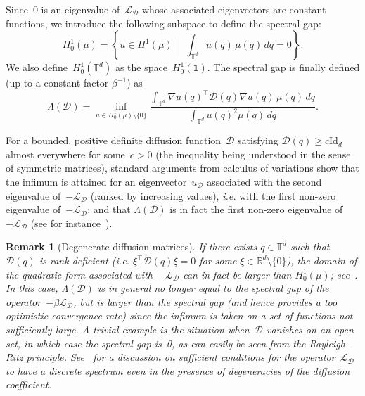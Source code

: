 \documentclass{article}
\newtheorem{remark}{Remark}
\newcommand{\dps}{\displaystyle }
\newcommand{\cL}{\mathcal{L}}
\newcommand{\R}{\mathbb{R}}
\newcommand{\Id}{\mathrm{Id}}
\renewcommand{\geq}{\geqslant}
\def\R{\mathbb{R}}
\def\T{\mathbb{T}}
\newcommand{\Diff}{\mathcal{D}}
\renewcommand{\dim}{d}
\newcommand{\cLD}{\cL_\Diff}
\begin{document}
Since~0 is an eigenvalue of~$\cLD$ whose associated eigenvectors are constant functions, we introduce the following subspace to define the spectral gap:
\[
H^1_0(\mu) = \left\{ u \in H^1(\mu) \ \middle| \ \int_{\T^\dim} u(q) \, \mu(q) \, dq = 0\right\}.
\]
We also define~$H^1_0(\T^\dim)$ as the space~$H^1_0(\mathbf{1})$. 
The spectral gap is finally defined (up to a constant factor $\beta^{-1}$) as
\begin{equation}
  \label{eq:lambdaD-init}
  \Lambda(\Diff) = \inf_{u \in H^1_0(\mu) \setminus\{0\}} \frac{\dps \int_{\T^\dim} \nabla u (q)^{\top}\Diff(q) \nabla u (q) \, \mu(q)\,dq}{\dps \int_{\T^\dim} u(q)^2 \mu(q)\,dq}.
\end{equation}

For a bounded, positive definite diffusion function~$\Diff$ satisfying $\Diff(q) \geq c \Id_\dim$ almost everywhere for some~$c>0$ (the inequality being understood in the sense of symmetric matrices), standard arguments from calculus of variations
show that the infimum is attained for an eigenvector~$u_\Diff$ associated with the second eigenvalue of~$-\cLD$ (ranked by increasing values), \emph{i.e.} with the first non-zero eigenvalue of~$-\cLD$; and that $\Lambda(\Diff)$ is in fact the first non-zero eigenvalue of $-\cLD$ (see for instance~\cite[Chapter~1]{Henrot}).

\begin{remark}[Degenerate diffusion matrices]
  \label{rmk:SG_when_\dim_cancels}
  If there exists $q\in\T^\dim$ such that $\Diff(q)$ is rank deficient (\emph{i.e.} $\xi^{\top}\Diff(q)\xi=0$ for some $\xi\in\R^\dim \setminus \{0\}$), the domain of the quadratic form associated with~$-\cLD$ can in fact be larger than $H^1_0(\mu)$; see~\cite{Zhikov_1998}. In this case, $\Lambda(\Diff)$ is in general no longer equal to the spectral gap of the operator~$-\beta \cLD$, but is larger than the spectral gap (and hence provides a too optimistic convergence rate) since the infimum is taken on a set of functions not sufficiently large. A trivial example is the situation when~$\Diff$ vanishes on an open set, in which case the spectral gap is~0, as can easily be seen from the Rayleigh--Ritz principle. See~\cite[Remark~1.2.3]{Henrot} for a discussion on sufficient conditions for the operator~$\cLD$ to have a discrete spectrum even in the presence of degeneracies of the diffusion coefficient.
\end{remark}
\end{document}
